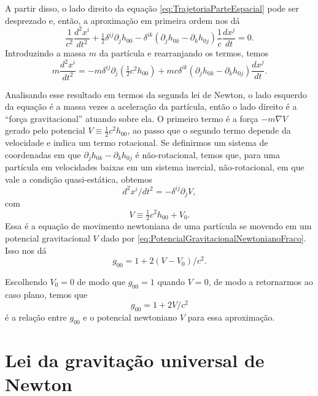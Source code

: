 A partir disso, o lado direito da equação \eqref{eq:TrajetoriaParteEspacial} pode ser desprezado e, então, a aproximação em primeira ordem nos dá
\[
\frac{1}{c^{2}} \frac{d^{2} x^{i}}{d t^{2}}+\tfrac{1}{2} \delta^{i j} \partial_{j} h_{00}-\delta^{i k}\left(\partial_{j} h_{0 k}-\partial_{k} h_{0 j}\right) \frac{1}{c} \frac{d x^{j}}{d t}=0 .
\]
Introduzindo a massa $ m $ da partícula e rearranjando os termos, temos
\begin{equation}\label{eq:TrajetoriaParticulaComMassa}
m \frac{d^{2} x^{i}}{d t^{2}}=-m \delta^{i j} \partial_{j}\left(\tfrac{1}{2} c^{2} h_{00}\right)+m c \delta^{i k}\left(\partial_{j} h_{0 k}-\partial_{k} h_{0 j}\right) \frac{d x^{j}}{d t} .
\end{equation}

Analisando esse resultado em termos da segunda lei de Newton, o lado esquerdo da equação é a massa vezes a aceleração da partícula, então o lado direito é a ``força gravitacional'' atuando sobre ela. O primeiro termo é a força $ -m \nabla V $ gerado pelo potencial $ V \equiv \tfrac{1}{2} c^{2} h_{00} $, ao passo que o segundo termo depende da velocidade e indica um termo rotacional. Se definirmos um sistema de coordenadas em que $ \partial_{j} h_{0 k}-\partial_{k} h_{0 j} $ é não-rotacional, temos que, para uma partícula em velocidades baixas em um sistema inercial, não-rotacional, em que vale a condição quasi-estática, obtemos
\begin{equation}\label{eq:EquacaoMovimentoPotencial}
d^{2} x^{i} / d t^{2}=-\delta^{i j} \partial_{j} V,
\end{equation}
com
\begin{equation}\label{eq:PotencialGravitacionalNewtonianoFraco}
V \equiv \tfrac{1}{2} c^{2} h_{00}+V_0.
\end{equation}
Essa é a equação de movimento newtoniana de uma partícula se movendo em um potencial gravitacional $ V $ dado por \eqref{eq:PotencialGravitacionalNewtonianoFraco}. Isso nos dá
\[
g_{00}=1+ 2(V-V_0) / c^{2}.
\]

Escolhendo $ V_0=0 $ de modo que $ g_{00} = 1 $ quando $ V=0 $, de modo a retornarmos ao caso plano, temos que
\begin{equation}\label{eq:RelacaoG00Potencial}
\boxed{
g_{00}=1+2 V / c^{2}}
\end{equation}
é a relação entre $ g_{00} $ e o potencial newtoniano $ V $ para essa aproximação.

\section{Lei da gravitação universal de Newton}\label{sec:GravitacaoNewton}

